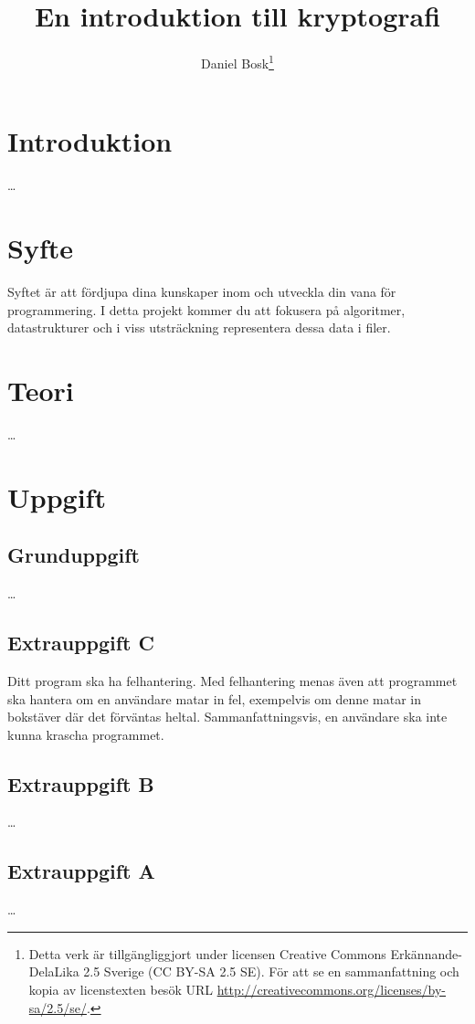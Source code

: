 \documentclass[a4paper]{miunasgn}
\title{En introduktion till kryptografi}
\author{Daniel Bosk\footnote{%
	Detta verk är tillgängliggjort under licensen Creative Commons 
	Erkännande-DelaLika 2.5 Sverige (CC BY-SA 2.5 SE).
	För att se en sammanfattning och kopia av licenstexten besök URL 
	\url{http://creativecommons.org/licenses/by-sa/2.5/se/}.
}}
\date{\svnId}
\theoremstyle{definition}
\begin{document}
\maketitle
\thispagestyle{foot}
\tableofcontents


\section{Introduktion}
\noindent
\dots


\section{Syfte}
\noindent
Syftet är att fördjupa dina kunskaper inom och utveckla din vana för 
programmering.
I detta projekt kommer du att fokusera på algoritmer, datastrukturer och i viss 
utsträckning representera dessa data i filer.


\section{Teori}
\label{sec:Theory}
\noindent
\dots


\section{Uppgift}
\label{sec:Tasks}
\noindent


\subsection{Grunduppgift}
\noindent
\dots

\subsection{Extrauppgift C}
\noindent
Ditt program ska ha felhantering.
Med felhantering menas även att programmet ska hantera om en användare matar in 
fel, exempelvis om denne matar in bokstäver där det förväntas heltal.
Sammanfattningsvis, en användare ska inte kunna krascha programmet.

\subsection{Extrauppgift B}
\noindent
\dots

\subsection{Extrauppgift A}
\noindent
\dots






\end{document}
